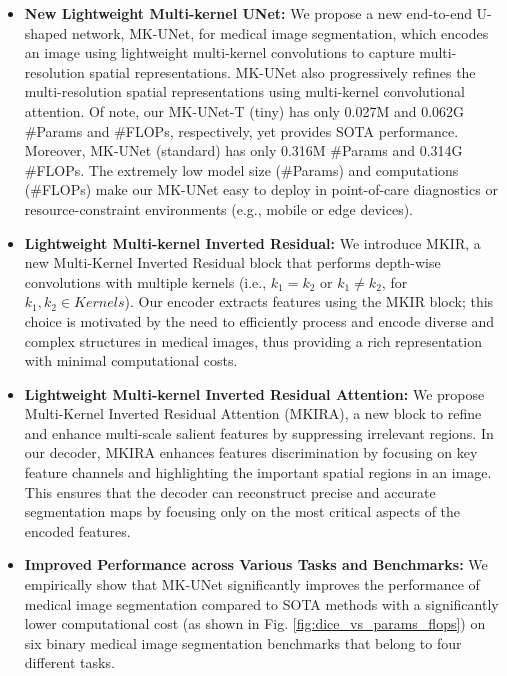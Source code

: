 \begin{itemize}
    \item \textbf{New Lightweight Multi-kernel UNet:} We propose a new end-to-end U-shaped network, MK-UNet, for medical image segmentation, which encodes an image using lightweight multi-kernel convolutions to capture multi-resolution spatial representations. MK-UNet also progressively refines the multi-resolution spatial representations using multi-kernel convolutional attention. Of note, our MK-UNet-T (tiny) has only 0.027M and 0.062G \#Params and \#FLOPs, respectively, yet provides SOTA performance. Moreover, MK-UNet (standard) has only 0.316M \#Params and 0.314G \#FLOPs. The extremely low model size (\#Params) and computations (\#FLOPs) make our MK-UNet easy to deploy in point-of-care diagnostics or resource-constraint environments (e.g., mobile or edge devices).
    \item \textbf{Lightweight Multi-kernel Inverted Residual:} We introduce MKIR, a new Multi-Kernel Inverted Residual block that performs depth-wise convolutions with multiple kernels (i.e., $k_1=k_2$ or $k_1 \neq k_2$, for $k_1, k_2 \in Kernels$). Our encoder extracts features using the MKIR block; this choice is motivated by the need to efficiently process and encode diverse and complex structures in medical images, thus providing a rich representation with minimal computational costs.
    \item \textbf{Lightweight Multi-kernel Inverted Residual Attention:} We propose Multi-Kernel Inverted Residual Attention (MKIRA), a new block to refine and enhance multi-scale salient features by suppressing irrelevant regions. In our decoder, MKIRA enhances features discrimination by focusing on key feature channels and highlighting the important spatial regions in an image. This ensures that the decoder can reconstruct precise and accurate segmentation maps by focusing only on the most critical aspects of the encoded features. 
    \item \textbf{Improved Performance across Various Tasks and Benchmarks:} We empirically show that MK-UNet significantly improves the performance of medical image segmentation compared to SOTA methods with a significantly lower computational cost (as shown in Fig. \ref{fig:dice_vs_params_flops}) on six binary medical image segmentation benchmarks that belong to four different tasks.
\end{itemize}

